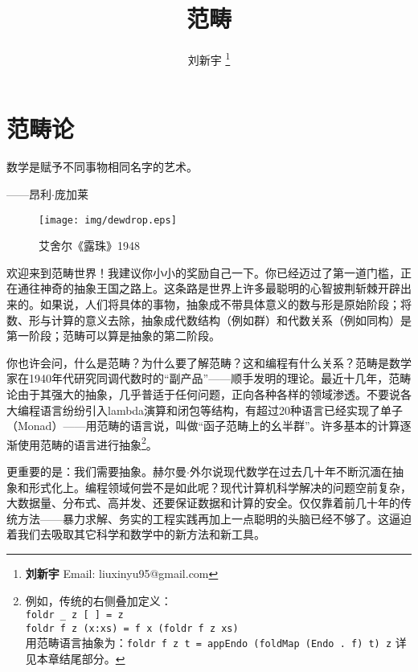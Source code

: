 \documentclass{article}
\begin{document}
\title{范畴}

\author{刘新宇
\thanks{{\bfseries 刘新宇} \newline
  Email: liuxinyu95@gmail.com \newline}
  }

\maketitle
\fi


\ifx\wholebook\relax
\chapter{范畴论}
\fi

\epigraph{数学是赋予不同事物相同名字的艺术。}{——昂利$\cdot$庞加莱}


\begin{wrapfigure}{R}{0.4\textwidth}
 \centering
 \texttt{[image: img/dewdrop.eps]}
 \captionsetup{labelformat=empty}
 \caption{艾舍尔《露珠》1948}
 \label{fig:Escher-Dewdrop-1948}
\end{wrapfigure}

欢迎来到范畴世界！我建议你小小的奖励自己一下。你已经迈过了第一道门槛，正在通往神奇的抽象王国之路上。这条路是世界上许多最聪明的心智披荆斩棘开辟出来的。如果说，人们将具体的事物，抽象成不带具体意义的数与形是原始阶段；将数、形与计算的意义去除，抽象成代数结构（例如群）和代数关系（例如同构）是第一阶段；范畴可以算是抽象的第二阶段。

你也许会问，什么是范畴？为什么要了解范畴？这和编程有什么关系？范畴是数学家在1940年代研究同调代数时的“副产品”——顺手发明的理论。最近十几年，范畴论由于其强大的抽象，几乎普适于任何问题，正向各种各样的领域渗透。不要说各大编程语言纷纷引入lambda演算和闭包等结构，有超过20种语言已经实现了单子（Monad）\cite{Monad-Haskell-Wiki}——用范畴的语言说，叫做“函子范畴上的幺半群”。许多基本的计算逐渐使用范畴的语言进行抽象\footnote{例如，传统的右侧叠加定义：\\
\texttt{foldr \_ z {[} {]} = z} \\
\texttt{foldr f z (x:xs) = f x (foldr f z xs)} \\
用范畴语言抽象为：\texttt{foldr f z t = appEndo (foldMap (Endo . f) t) z} 详见本章结尾部分。}。

更重要的是：我们需要抽象。赫尔曼$\cdot$外尔说现代数学在过去几十年不断沉湎在抽象和形式化上。编程领域何尝不是如此呢？现代计算机科学解决的问题空前复杂，大数据量、分布式、高并发、还要保证数据和计算的安全。仅仅靠着前几十年的传统方法——暴力求解、务实的工程实践再加上一点聪明的头脑已经不够了。这逼迫着我们去吸取其它科学和数学中的新方法和新工具。
\end{document}
